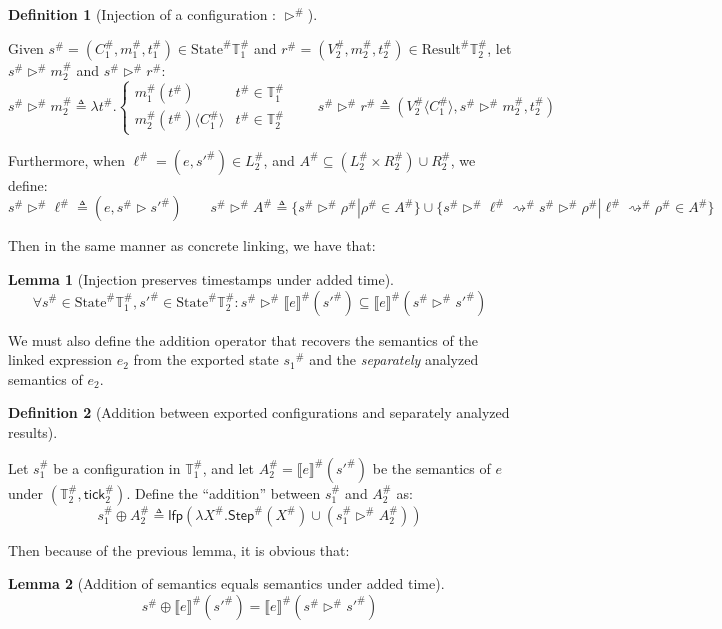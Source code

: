 \documentclass[acmsmall,review]{acmart}\settopmatter{printfolios=true,printccs=false,printacmref=false}
\theoremstyle{definition}
\newtheorem{definition}{Definition}[section]
\newtheorem{lem}{Lemma}[section]
\newcommand*{\A}[1]{{#1}^{\#}}
\newcommand*{\Time}{\mathbb{T}}
\newcommand*{\ATime}{\A{\Time}}
\newcommand*{\mem}{m}
\newcommand*{\AState}{\A{\text{State}}}
\newcommand*{\AResult}{\A{\text{Result}}}
\newcommand*{\semarrow}{\rightsquigarrow}
\newcommand*{\sembracket}[1]{\lBrack{#1}\rBrack}
\newcommand*{\tick}{\mathsf{tick}}
\newcommand*{\inject}[2]{{#2}\langle{#1}\rangle}
\begin{document}
\begin{definition}[Injection of a configuration : $\A\rhd$]
  $\:$

  Given $\A{s}=(\A{C}_1,\A{\mem}_1,\A{t}_1)\in\AState{\ATime_1}$ and $\A{r}=(\A{V}_2,\A{\mem}_2,\A{t}_2)\in\AResult{\ATime_2}$,
  let $\A{s}\A\rhd \A{\mem}_2$ and $\A{s}\A\rhd \A{r}$:
  \[
    \A{s}\A\rhd\A{\mem}_2\triangleq
    \lambda \A{t}.
    \begin{cases}
      \A{\mem}_1(\A{t})                   & \A{t}\in\ATime_1 \\
      \inject{\A{C}_1}{\A{\mem}_2(\A{t})} & \A{t}\in\ATime_2
    \end{cases}
    \qquad
    \A{s}\A\rhd \A{r}\triangleq
    (\inject{\A{C}_1}{\A{V}_2},\A{s}\A\rhd \A{\mem}_2,\A{t}_2)
  \]

  Furthermore, when $\A\ell=(e,\A{s'})\in \A{L}_2$, and $\A{A}\subseteq (\A{L}_2\times \A{R}_2)\cup \A{R}_2$, we define:
  \[
    \A{s}\A\rhd\A\ell\triangleq(e,\A{s}\rhd \A{s'})\qquad
    \A{s}\A\rhd\A{A}\triangleq\{\A{s}\A\rhd\A\rho|\A\rho\in \A{A}\}\cup\{\A{s}\A\rhd\A\ell\A\semarrow \A{s}\A\rhd\A\rho|\A\ell\A\semarrow\A\rho\in \A{A}\}
  \]
\end{definition}

Then in the same manner as concrete linking, we have that:

\begin{lem}[Injection preserves timestamps under added time]
  \[
    \forall \A{s}\in\AState{\ATime_1},\A{s'}\in\AState{\ATime_2}:\A{s}\A\rhd{\A{\sembracket{e}}}(\A{s'})\subseteq\A{\sembracket{e}}(\A{s}\A\rhd\A{s'})
  \]
\end{lem}

We must also define the addition operator that recovers the semantics of the linked expression $e_2$ from the exported state $\A{s_1}$ and the \emph{separately} analyzed semantics of $e_2$.

\begin{definition}[Addition between exported configurations and separately analyzed results]
  $\:$

  Let $\A{s}_1$ be a configuration in $\ATime_1$, and let $\A{A}_2=\A{\sembracket{e}}(\A{s'})$ be the semantics of $e$ under $(\ATime_2,\A\tick_2)$.
  Define the ``addition'' between $\A{s}_1$ and $\A{A}_2$ as:
  \[
    \A{s}_1\oplus\A{A}_2\triangleq\mathsf{lfp}(\lambda\A{X}.\A{\mathsf{Step}}(\A{X})\cup(\A{s}_1\A\rhd\A{A}_2))
  \]
\end{definition}

Then because of the previous lemma, it is obvious that:
\begin{lem}[Addition of semantics equals semantics under added time]
  \[
    \A{s}\oplus\A{\sembracket{e}}(\A{s'}) = \A{\sembracket{e}}(\A{s}\A\rhd\A{s'})
  \]
\end{lem}
\end{document}
